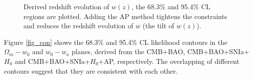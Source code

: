 \documentclass[iop]{emulateapj}
\begin{document}
\begin{figure}
   \caption{\label{fig_wz}
   Derived redshift evolution of $w(z)$, the 68.3\% and 95.4\% CL regions are plotted.
   Adding the AP method tightens the constraints and reduces the redshift evolution of $w$ (the tilt of $w(z)$).
   }
\end{figure}





Figure \ref{fig_con} shows the 68.3\% and 95.4\% CL likelihood contours in the $\Omega_m - w_0$  and $w_0 - w_a$ planes,
derived from the CMB+BAO, CMB+BAO+SNIa+$H_0$ and CMB+BAO+SNIa+$H_0$+AP, respectively.
The overlapping of different contours suggest that they are consistent with each other.
\end{document}
